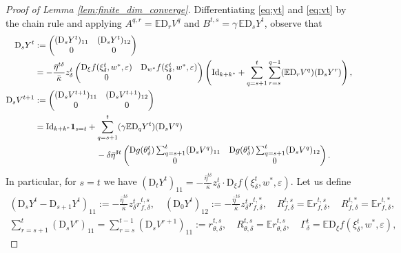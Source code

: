 \documentclass[11pt,letterpaper,reqno]{amsart}
\theoremstyle{definition}
\def\eps{\varepsilon}
\def\D{\mathrm{D}}
\def\E{\mathbb{E}}
\def\Id{\mathrm{Id}}
\def\1{\mathbf{1}}
\begin{document}
\begin{proof}[Proof of Lemma \ref{lem:finite_dim_converge}]
Differentiating \eqref{eq:yt}
and \eqref{eq:vt} by the chain rule and applying $A^{q,r}=\E \D_rV^q$
and $B^{t,s}=\gamma\,\E \D_s Y^t$, observe that
\begin{align}
\D_s Y^t&:=\begin{pmatrix} (\D_s Y^t)_{11} & (\D_s Y^t)_{12} \\ 0 & 0
\end{pmatrix}\notag\\
&={-}\frac{\bar\eta^{t\delta}}{\bar\kappa}z_\delta^t \begin{pmatrix} 
\D_\xi f(\xi_\delta^t,w^*,\eps)
& \D_{w^*} f(\xi_\delta^t,w^*,\eps)\\ 0 & 0 \end{pmatrix}
\left(\Id_{k+k^*}+\sum_{q=s+1}^t \sum_{r=s}^{q-1}(\E \D_r V^q)(\D_s
Y^r)\right),\label{eq:AMPchainrule1}\\
\D_s V^{t+1}&:=\begin{pmatrix} (\D_s V^{t+1})_{11} & (\D_s V^{t+1})_{12}
\\ 0 & 0 \end{pmatrix}\notag\\
&=\Id_{k+k^*}\1_{s=t}
+\sum_{q=s+1}^t (\gamma \E \D_q Y^t)(\D_s V^q)\notag\\
&\hspace{1in}- \delta \bar\eta^{\delta t}\begin{pmatrix}\D g(\theta_\delta^t)
\sum_{q=s+1}^t (\D_s V^q)_{11} & \D g(\theta_\delta^t)
\sum_{q=s+1}^t (\D_s V^q)_{12} \\ 0 & 0 \end{pmatrix}.
\label{eq:AMPchainrule2}
\end{align}
In particular, for $s=t$ we have $(\D_t
Y^t)_{11}={-}\frac{\bar\eta^{t\delta}}{\bar\kappa}z_\delta^t \cdot \D_\xi
f(\xi_\delta^t,w^*,\eps)$. Let us define
\begin{equation}\label{eq:AMPresponsedefs}
\begin{gathered}
(\D_sY^t-\D_{s+1}Y^t)_{11}
:={-}\frac{\bar\eta^{t\delta}}{\bar\kappa}z_\delta^t r_{f,\delta}^{t,s},
\quad (\D_0Y^t)_{12}:=
{-}\frac{\bar\eta^{t\delta}}{\bar\kappa}z_\delta^t r_{f,\delta}^{t,*},
\quad R_{f,\delta}^{t,s}=\E r_{f,\delta}^{t,s},
\quad R_{f,\delta}^{t,*}=\E r_{f,\delta}^{t,*},\\
\sum_{r=s+1}^t (\D_s V^r)_{11}
=\sum_{r=s}^{t-1} (\D_s V^{r+1})_{11}:=r_{\theta,\delta}^{t,s},
\quad R_{\theta,\delta}^{t,s}=\E r_{\theta,\delta}^{t,s},
\quad \Gamma_\delta^t=\E \D_\xi f(\xi_\delta^t,w^*,\eps),
\end{gathered}
\end{equation}

\end{proof}
\end{document}
